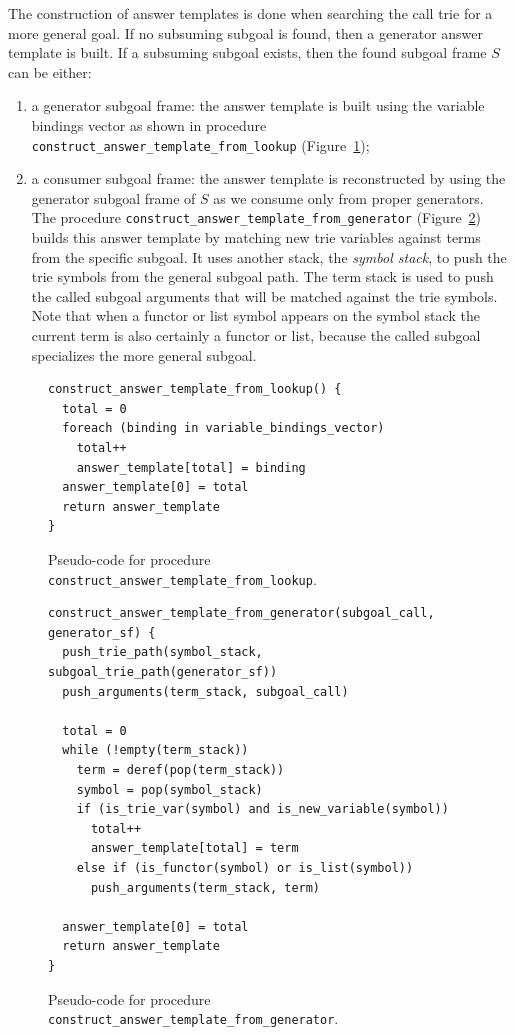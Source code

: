 The construction of answer templates is done when searching the call trie for a more general goal.
If no subsuming subgoal is found, then a generator answer template is built. If a subsuming subgoal
exists, then the found subgoal frame $S$ can be either:

\begin{enumerate}
  \item a generator subgoal frame: the answer template is built using
  the variable bindings vector as shown in procedure \texttt{construct\_answer\_template\_from\_lookup}
  (Figure~\ref{fig:construct_answer_template_from_lookup});
  
  \item a consumer subgoal frame: the answer template is reconstructed by using the generator
  subgoal frame of $S$ as we consume only from proper generators. 
  The procedure \texttt{construct\_answer\_template\_from\_generator}
  (Figure~\ref{fig:construct_answer_template_from_generator}) builds this answer template by
  matching new trie variables against terms from the specific subgoal. It
  uses another stack, the \textit{symbol stack}, to push the trie
  symbols from the general subgoal path. The term stack is used to push the called subgoal arguments that
  will be matched against the trie symbols. Note that when a functor or list symbol appears
  on the symbol stack the current term is also certainly a functor or list, because the called subgoal
  specializes the more general subgoal.
\end{enumerate}

\begin{figure}[ht]
\begin{Verbatim}
construct_answer_template_from_lookup() {
  total = 0
  foreach (binding in variable_bindings_vector)
    total++
    answer_template[total] = binding
  answer_template[0] = total
  return answer_template
}
\end{Verbatim}
\caption{Pseudo-code for procedure \texttt{construct\_answer\_template\_from\_lookup}.}
\label{fig:construct_answer_template_from_lookup}
\end{figure}

\begin{figure}[ht]
\begin{Verbatim}
construct_answer_template_from_generator(subgoal_call, generator_sf) {
  push_trie_path(symbol_stack, subgoal_trie_path(generator_sf))
  push_arguments(term_stack, subgoal_call)
  
  total = 0
  while (!empty(term_stack))
    term = deref(pop(term_stack))
    symbol = pop(symbol_stack)
    if (is_trie_var(symbol) and is_new_variable(symbol))
      total++
      answer_template[total] = term
    else if (is_functor(symbol) or is_list(symbol))
      push_arguments(term_stack, term)
  
  answer_template[0] = total
  return answer_template
}
\end{Verbatim}
\caption{Pseudo-code for procedure \texttt{construct\_answer\_template\_from\_generator}.}
\label{fig:construct_answer_template_from_generator}
\end{figure}

